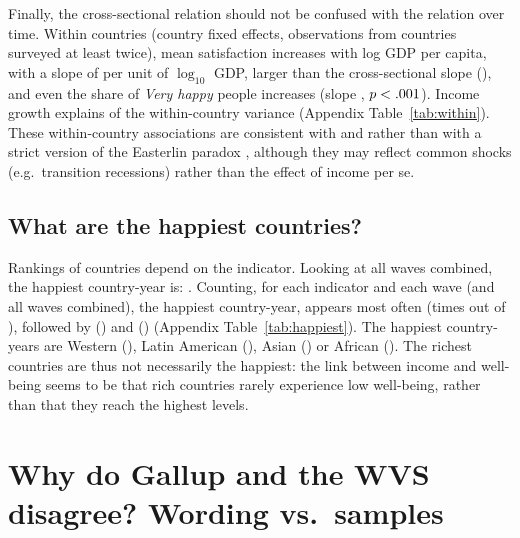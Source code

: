 \documentclass[12pt]{article}
\begin{document}
Finally, the cross-sectional relation should not be confused with the relation over time. Within countries (country fixed effects, \nWithin observations from countries surveyed at least twice), mean satisfaction increases with log GDP per capita, with a slope of \withinSlopeSatisfiedMean per unit of $\log_{10}$ GDP, larger than the cross-sectional slope (\crossSlopeSatisfiedMean), and even the share of \textit{Very happy} people increases (slope \withinSlopeVeryHappy, $p < .001$). Income growth explains \withinRtwoSatisfiedMean of the within-country variance (Appendix Table~\ref{tab:within}). These within-country associations are consistent with \citet{stevenson_economic_2008} and \citet{sacks_new_2012} rather than with a strict version of the Easterlin paradox \citep{easterlin_does_1974,easterlin_happiness_2010}, although they may reflect common shocks (e.g.\ transition recessions) rather than the effect of income per se.

\subsection{What are the happiest countries?}\label{subsec:happiest}

Rankings of countries depend on the indicator. Looking at all waves combined, the happiest country-year is: \happiestAllWaves. %
Counting, for each indicator and each wave (and all waves combined), the happiest country-year, \happiestFirst appears most often (\happiestFirstN times out of \nHappiestCells), followed by \happiestSecond (\happiestSecondN) and \happiestThird (\happiestThirdN) (Appendix Table~\ref{tab:happiest}). The happiest country-years are Western (\happiestRegionWestern), Latin American (\happiestRegionLatinAmerica), Asian (\happiestRegionAsia) or African (\happiestRegionAfrica). The richest countries are thus not necessarily the happiest: the link between income and well-being seems to be that rich countries rarely experience low well-being, rather than that they reach the highest levels. 


\section{Why do Gallup and the WVS disagree? Wording vs.\ samples}\label{sec:discrepancy}
\end{document}
